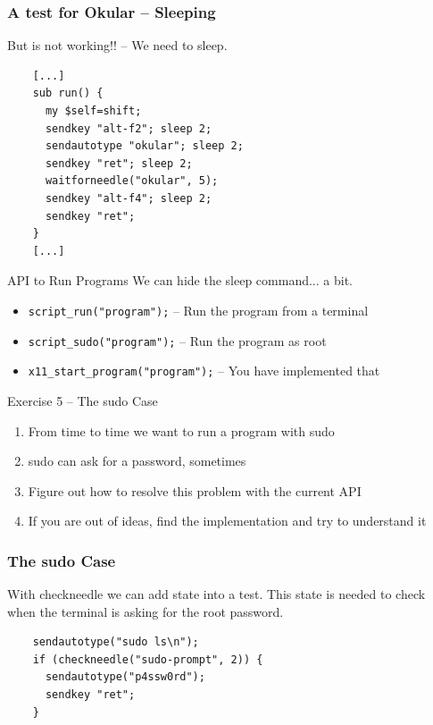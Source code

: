 \documentclass{beamer}
\begin{document}
\begin{frame}[fragile]
  \frametitle{A test for Okular -- Sleeping}
  But is not working!! -- We need to sleep.
  \lstset{style=myperl}
  \begin{lstlisting}
    [...]
    sub run() {
      my $self=shift;
      sendkey "alt-f2"; sleep 2;
      sendautotype "okular"; sleep 2;
      sendkey "ret"; sleep 2;
      waitforneedle("okular", 5);
      sendkey "alt-f4"; sleep 2;
      sendkey "ret";
    }
    [...]
  \end{lstlisting}
\end{frame}

\begin{frame}{API to Run Programs}
  We can hide the sleep command... a bit.
  \begin{itemize}
  \item \texttt{script\_run("program");} -- Run the program from a terminal
  \item \texttt{script\_sudo("program");} -- Run the program as root
  \item \texttt{x11\_start\_program("program");} -- You have implemented that
  \end{itemize}
\end{frame}

%
%
\begin{frame}{Exercise 5 -- The sudo Case}
  \begin{enumerate}
  \item From time to time we want to run a program with sudo
  \item sudo can ask for a password, sometimes
  \item Figure out how to resolve this problem with the current API
  \item If you are out of ideas, find the implementation and try to understand it
  \end{enumerate}
\end{frame}


\begin{frame}[fragile]
  \frametitle{The sudo Case}
  With checkneedle we can add state into a test. This state is needed
  to check when the terminal is asking for the root password.
  \lstset{style=myperl}
  \begin{lstlisting}
    sendautotype("sudo ls\n");
    if (checkneedle("sudo-prompt", 2)) {
      sendautotype("p4ssw0rd");
      sendkey "ret";
    }
  \end{lstlisting}
\end{frame}
\end{document}

